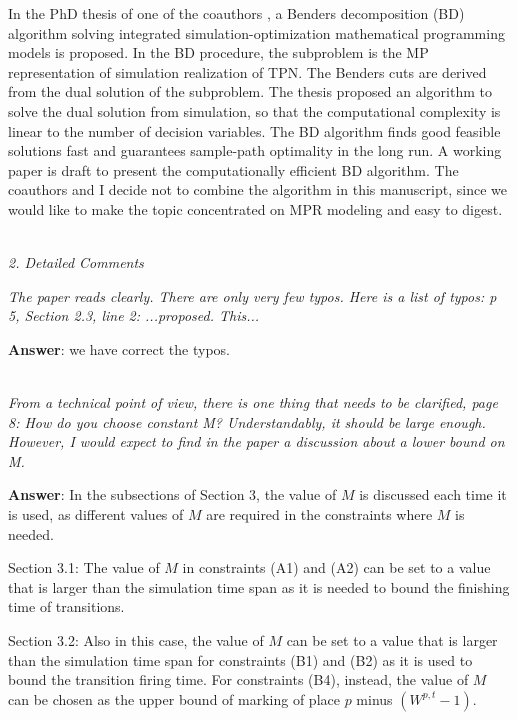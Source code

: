 \documentclass[suppldata]{interact}
\begin{document}
In the PhD thesis of one of the coauthors \citep{zhang2021resource}, a Benders decomposition (BD) algorithm solving integrated simulation-optimization mathematical programming models is proposed. In the BD procedure, the subproblem is the MP representation of simulation realization of TPN. The Benders cuts are derived from the dual solution of the subproblem. The thesis proposed an algorithm to solve the dual solution from simulation, so that the computational complexity is linear to the number of decision variables. The BD algorithm finds good feasible solutions fast and guarantees sample-path optimality in the long run. A working paper is draft to present the computationally efficient BD algorithm. The coauthors and I decide not to combine the algorithm in this manuscript, since we would like to make the topic concentrated on MPR modeling and easy to digest.


~\\

\textit{2. Detailed Comments}

\textit{The paper reads clearly. There are only very few typos. Here is a list of typos: p 5, Section 2.3, line 2: ...proposed. This...}

\noindent
\textbf{Answer}: we have correct the typos.

~\\

\textit{From a technical point of view, there is one thing that needs to be clarified, page 8: How do you choose constant M? Understandably, it should be large enough. However, I would expect to find in the paper a discussion about a lower bound on M.}

\noindent
\textbf{Answer}: In the subsections of Section 3, the value of $M$ is discussed each time it %
is used, as different values of $M$ are required in the constraints where $M$ is needed.

{Section 3.1: The value of $M$ in constraints (A1) and (A2) can be set to a value that is larger than the simulation time span as it is needed to bound the finishing time of transitions.}

{Section 3.2: Also in this case, the value of $M$ can be set to a value that is larger than the simulation time span for constraints (B1) and (B2) as 
it is used to bound the transition firing time. %
For constraints (B4), instead, the value of $M$ can be chosen as the upper bound of marking of place $p$ minus $(W^{p,t}-1)$.}
\end{document}
